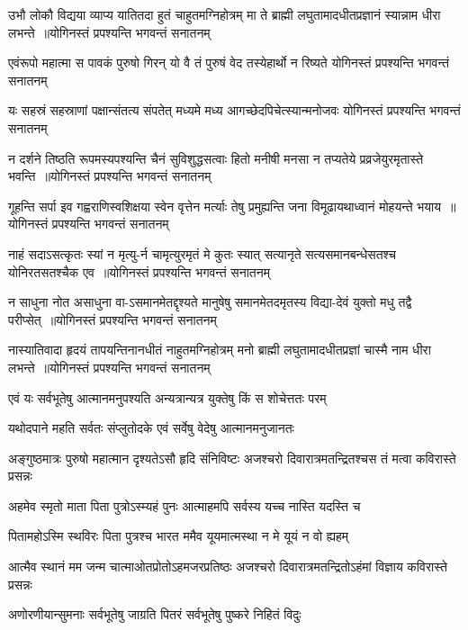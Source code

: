 \twolineshloka
{उभौ लोकौ विद्यया व्याप्य यातितदा हुतं चाहुतमग्निहोत्रम्}
{मा ते ब्राह्मी लघुतामादधीतप्रज्ञानं स्यान्नाम धीरा लभन्ते ॥योगिनस्तं प्रपश्यन्ति भगवन्तं सनातनम्}


\threelineshloka
{एवंरूपो महात्मा स पावकं पुरुषो गिरन्}
{यो वै तं पुरुषं वेद तस्येहार्थो न रिष्यते}
{योगिनस्तं प्रपश्यन्ति भगवन्तं सनातनम्}


\threelineshloka
{यः सहस्रं सहस्राणां पक्षान्संतत्य संपतेत्}
{मध्यमे मध्य आगच्छेदपिचेत्स्यान्मनोजवः}
{योगिनस्तं प्रपश्यन्ति भगवन्तं सनातनम्}


\twolineshloka
{न दर्शने तिष्ठति रूपमस्यपश्यन्ति चैनं सुविशुद्धसत्वाः}
{हितो मनीषी मनसा न तप्यतेये प्रव्रजेयुरमृतास्ते भवन्ति ॥योगिनस्तं प्रपश्यन्ति भगवन्तं सनातनम्}


\twolineshloka
{गूहन्ति सर्पा इव गह्वराणिस्वशिक्षया स्वेन वृत्तेन मर्त्याः}
{तेषु प्रमुह्यन्ति जना विमूढायथाध्वानं मोहयन्ते भयाय ॥योगिनस्तं प्रपश्यन्ति भगवन्तं सनातनम्}


\twolineshloka
{नाहं सदाऽसत्कृतः स्यां न मृत्यु-र्न चामृत्युरमृतं मे कुतः स्यात्}
{सत्यानृते सत्यसमानबन्धेसतश्च योनिरतसतश्चैक एव ॥योगिनस्तं प्रपश्यन्ति भगवन्तं सनातनम्}


\twolineshloka
{न साधुना नोत असाधुना वा-ऽसमानमेतद्दृश्यते मानुषेषु}
{समानमेतदमृतस्य विद्या-देवं युक्तो मधु तद्वै परीप्सेत् ॥योगिनस्तं प्रपश्यन्ति भगवन्तं सनातनम्}


\twolineshloka
{नास्यातिवादा हृदयं तापयन्तिनानधीतं नाहुतमग्निहोत्रम्}
{मनो ब्राह्मी लघुतामादधीतप्रज्ञां चास्मै नाम धीरा लभन्ते ॥योगिनस्तं प्रपश्यन्ति भगवन्तं सनातनम्}


\threelineshloka
{एवं यः सर्वभूतेषु आत्मानमनुपश्यति}
{अन्यत्रान्यत्र युक्तेषु किं स शोचेत्ततः परम्}
{}


\twolineshloka
{यथोदपाने महति सर्वतः संप्लुतोदके}
{एवं सर्वेषु वेदेषु आत्मानमनुजानतः}


\twolineshloka
{अङ्गुष्ठमात्रः पुरुषो महात्मान दृश्यतेऽसौ हृदि संनिविष्टः}
{अजश्चरो दिवारात्रमतन्द्रितश्चस तं मत्वा कविरास्ते प्रसन्नः}


\twolineshloka
{अहमेव स्मृतो माता पिता पुत्रोऽस्म्यहं पुनः}
{आत्माहमपि सर्वस्य यच्च नास्ति यदस्ति च}


\twolineshloka
{पितामहोऽस्मि स्थविरः पिता पुत्रश्च भारत}
{ममैव यूयमात्मस्था न मे यूयं न वो ह्यहम्}


\twolineshloka
{आत्मैव स्थानं मम जन्म चात्माओतप्रोतोऽहमजरप्रतिष्ठः}
{अजश्चरो दिवारात्रमतन्द्रितोऽहंमां विज्ञाय कविरास्ते प्रसन्नः}


\twolineshloka
{अणोरणीयान्सुमनाः सर्वभूतेषु जाग्रति}
{पितरं सर्वभूतेषु पुष्करे निहितं विदुः}


